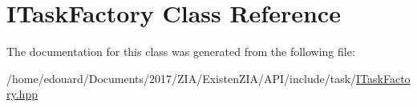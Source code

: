 \hypertarget{classITaskFactory}{}\section{I\+Task\+Factory Class Reference}
\label{classITaskFactory}


The documentation for this class was generated from the following file\+:\begin{DoxyCompactItemize}
\item 
/home/edouard/\+Documents/2017/\+Z\+I\+A/\+Existen\+Z\+I\+A/\+A\+P\+I/include/task/\mbox{\hyperlink{ITaskFactory_8hpp}{I\+Task\+Factory.\+hpp}}\end{DoxyCompactItemize}
